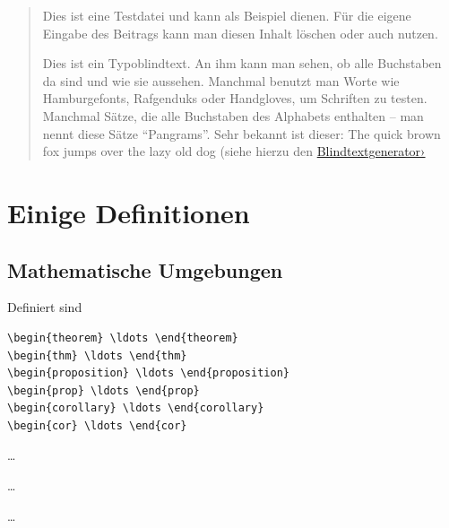 \begin{refsection}
\begin{quote}
Dies ist eine Testdatei und kann als Beispiel dienen.
Für die eigene Eingabe des Beitrags kann man diesen Inhalt löschen oder auch nutzen.

Dies ist ein Typoblindtext. 
An ihm kann man sehen, ob alle Buchstaben da sind und wie sie aussehen. 
Manchmal benutzt man Worte wie Hamburgefonts, Rafgenduks oder Handgloves, um Schriften zu testen. 
Manchmal Sätze, die alle Buchstaben des Alphabets enthalten -- man nennt diese Sätze \enquote{Pangrams}. 
Sehr bekannt ist dieser: { The quick brown fox jumps over the lazy old dog} (siehe hierzu den \href{https://www.blindtextgenerator.de}{Blindtextgenerator›}
\end{quote}
\section*{Einige Definitionen}
\subsection*{Mathematische Umgebungen}
Definiert sind
\begin{verbatim}
\begin{theorem} \ldots \end{theorem}
\begin{thm} \ldots \end{thm}
\begin{proposition} \ldots \end{proposition}
\begin{prop} \ldots \end{prop}
\begin{corollary} \ldots \end{corollary}
\begin{cor} \ldots \end{cor}
\end{verbatim}
\begin{theorem} 
	\ldots 
\end{theorem}
\begin{proposition} 
	\ldots 
\end{proposition}
\begin{corollary} 
	\ldots 
\end{corollary}

\end{refsection}
